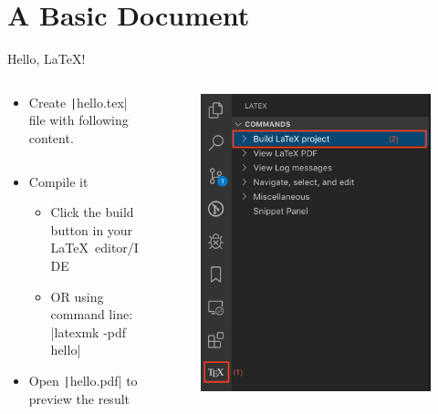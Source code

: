 \section{A Basic Document}

\begin{frame}[fragile]{Hello, \LaTeX!}
  \begin{columns}
    \begin{column}{.7\linewidth}
      \begin{itemize}
        \item Create \texttt|hello.tex| file with following content.
              \inputminted{latex}{./minted/hello.tex}
        \item Compile it
              \begin{itemize}
                \item Click the build button in your \LaTeX~editor/IDE
                \item OR using command line: \bashinline|latexmk -pdf hello|
              \end{itemize}
        \item Open \texttt|hello.pdf| to preview the result
      \end{itemize}
    \end{column}
    \begin{column}{.3\linewidth}
      \begin{figure}
        \centering
        \includegraphics[width=\linewidth]{./figs/vscode-compile-project.png}

\end{figure}
\end{column}
\end{columns}
\end{frame}
